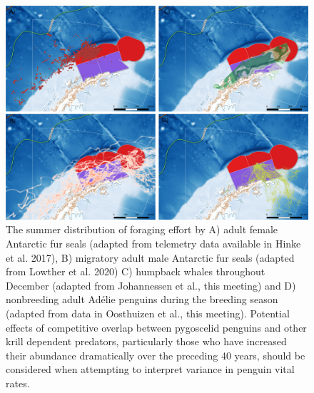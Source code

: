 \documentclass[]{elsarticle} %
\begin{document}
\begin{figure}
\includegraphics[width=1.2\linewidth]{./Watters EMM figures/Other spp distribution} \caption{The summer distribution of foraging effort by A) adult female Antarctic fur seals (adapted from telemetry data available in Hinke et al. 2017), B) migratory adult male Antarctic fur seals (adapted from Lowther et al. 2020) C) humpback whales throughout December (adapted from Johannessen et al., this meeting) and D) nonbreeding adult Adélie penguins during the breeding season (adapted from data in Oosthuizen et al., this meeting). Potential effects of competitive overlap between pygoscelid penguins and other krill dependent predators, particularly those who have increased their abundance dramatically over the preceding 40 years, should be considered when attempting to interpret variance in penguin vital rates.}\label{fig:other species plots}
\end{figure}
\end{document}
